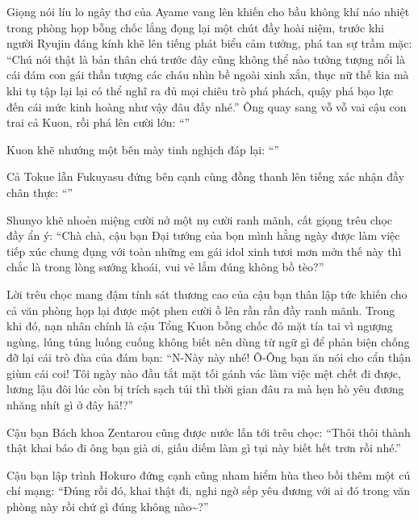 \documentclass[../main.tex]{subfiles}
\begin{document}
Giọng nói líu lo ngây thơ của Ayame vang lên khiến cho bầu không khí náo nhiệt trong phòng họp bỗng chốc lắng đọng lại một chút đầy hoài niệm, trước khi người Ryujin đáng kính khẽ lên tiếng phát biểu cảm tưởng, phá tan sự trầm mặc: ``Chú nói thật là bản thân chú trước đây cũng không thể nào tưởng tượng nổi là cái đám con gái thần tượng các cháu nhìn bề ngoài xinh xắn, thục nữ thế kia mà khi tụ tập lại lại có thể nghĩ ra đủ mọi chiêu trò phá phách, quậy phá bạo lực đến cái mức kinh hoàng như vậy đâu đấy nhé.'' Ông quay sang vỗ vỗ vai cậu con trai cả Kuon, rồi phá lên cười lớn: ``''

Kuon khẽ nhướng một bên mày tinh nghịch đáp lại: ``''

Cả Tokue lẫn Fukuyasu đứng bên cạnh cùng đồng thanh lên tiếng xác nhận đầy chân thực: ``''

Shunyo khẽ nhoẻn miệng cười nở một nụ cười ranh mãnh, cất giọng trêu chọc đầy ẩn ý: ``Chà chà, cậu bạn Đại tướng của bọn mình hằng ngày được làm việc tiếp xúc chung đụng với toàn những em gái idol xinh tươi mơn mởn thế này thì chắc là trong lòng sướng khoái, vui vẻ lắm đúng không bồ tèo?''

Lời trêu chọc mang đậm tính sát thương cao của cậu bạn thân lập tức khiến cho cả văn phòng họp lại được một phen cười ồ lên rần rần đầy ranh mãnh. Trong khi đó, nạn nhân chính là cậu Tổng Kuon bỗng chốc đỏ mặt tía tai vì ngượng ngùng, lúng túng luống cuống không biết nên dùng từ ngữ gì để phản biện chống đỡ lại cái trò đùa của đám bạn: ``N-Này này nhé! Ô-Ông bạn ăn nói cho cẩn thận giùm cái coi! Tôi ngày nào đầu tắt mặt tối gánh vác làm việc mệt chết đi được, lương lậu đôi lúc còn bị trích sạch túi thì thời gian đâu ra mà hẹn hò yêu đương nhăng nhít gì ở đây hả!?''

Cậu bạn Bách khoa Zentarou cũng được nước lấn tới trêu chọc: ``Thôi thôi thành thật khai báo đi ông bạn già ơi, giấu diếm làm gì tụi này biết hết trơn rồi nhé.''

Cậu bạn lập trình Hokuro đứng cạnh cũng nham hiểm hùa theo bồi thêm một cú chí mạng: ``Đúng rồi đó, khai thật đi, nghi ngờ sếp yêu đương với ai đó trong văn phòng này rồi chứ gì đúng không nào\~{}?''
\end{document}
